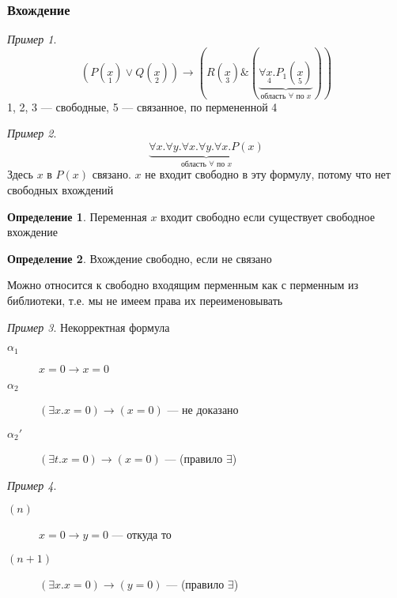 \documentclass[english]{article}
\theoremstyle{plain}
\theoremstyle{remark}
\newtheorem*{examp}{Пример}
\theoremstyle{definition}
\newtheorem*{definition}{Определение}
\begin{document}
\subsubsection{Вхождение}
\label{sec:org9b4d3c5}
\begin{examp}
\[ (P(\underset{1}{x}) \vee Q(\underset{2}{x})) \to (R(\underset{3}{x}) \& (\underbrace{\forall \underset{4}{x}. P_1(\underset{5}{x})}_{\text{область }\forall\text{ по }x})) \]
1, 2, 3 --- свободные, 5 --- связанное, по пермененной 4
\end{examp}
\begin{examp}
\[ \underbrace{\forall x. \forall y. \forall x. \forall y. \forall x. P(x)}_{\text{область }\forall\text{ по }x} \]
Здесь \(x\) в \(P(x)\) связано. \(x\) не входит свободно в эту формулу, потому что нет свободных вхождений
\end{examp}
\begin{definition}
Переменная \(x\) входит свободно если существует свободное вхождение
\end{definition}
\begin{definition}
Вхождение свободно, если не связано
\end{definition}
Можно относится к свободно входящим перменным как с перменным из библиотеки, т.е. мы не имеем права их переименовывать
\begin{examp}
Некорректная формула
\begin{description}
\item[{\(\alpha_1\)}] \(x = 0 \to x = 0\)
\item[{\(\alpha_2\)}] \color{red}\((\exists x. x = 0) \to (x = 0)\) --- не доказано\color{black}
\item[{\(\alpha_2'\)}] \((\exists t. x = 0) \to (x = 0)\) --- (правило \(\exists\))
\end{description}
\end{examp}
\begin{examp}
\-
\begin{description}
\item[{\((n)\)}] \(x = 0 \to y = 0\) --- откуда то
\item[{\((n + 1)\)}] \((\exists x. x = 0) \to (y = 0)\) --- (правило \(\exists\))
\end{description}
\end{examp}
\end{document}
